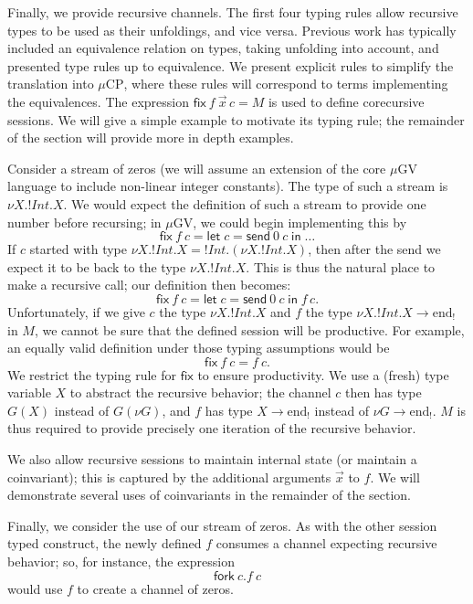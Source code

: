 \documentclass[orivec,envcountsame]{llncs}
\newcommand{\gvout}[2]{{!#1.#2}}
\newcommand{\uto}{\ensuremath{\rightarrow}}
\newcommand{\outterm}{\mathrm{end}_!}
\newcommand{\mkwd}[1]{\mathsf{#1}}
\newcommand{\gvsend}[2]{\mkwd{send}\:#1\:#2}
\newcommand{\gvlet}[3]{\mkwd{let}\;#1 = #2\;\mkwd{in}\;#3}
\newcommand{\gvfork}[2]{\mkwd{fork}\:#1.#2}
\newcommand{\lrkwd}{\mkwd{fix}}
\newcommand{\gvfix}[3]{\lrkwd\:#1\:#2 = #3}
\newcommand{\mucp}{$\mu\mathrm{CP}$\xspace}
\newcommand{\mugv}{$\mu\mathrm{GV}$\xspace}
\begin{document}
Finally, we provide recursive channels. The first four typing rules allow recursive types to be used
as their unfoldings, and vice versa. Previous work has typically included an equivalence relation on
types, taking unfolding into account, and presented type rules up to equivalence. We present
explicit rules to simplify the translation into \mucp, where these rules will correspond to terms
implementing the equivalences. The expression $\gvfix{f}{\vec{x}\,c}{M}$ is used to define
corecursive sessions.  We will give a simple example to motivate its typing rule; the remainder of
the section will provide more in depth examples.

Consider a stream of zeros (we will assume an extension of the core \mugv language to include
non-linear integer constants).  The type of such a stream is $\nu X. !Int.X$.  We would expect the
definition of such a stream to provide one number before recursing; in \mugv, we could begin
implementing this by
\[
  \lrkwd \: f\:c = \gvlet{c}{\gvsend{0}{c}}{\dots}
\]
If $c$ started with type $\nu X.\gvout{Int}{X} = \gvout{Int}{(\nu X.\gvout{Int}{X})}$, then after
the send we expect it to be back to the type $\nu X.\gvout{Int}{X}$.  This is thus the natural place
to make a recursive call; our definition then becomes:
\[ \lrkwd \: f\:c = \gvlet{c}{\gvsend{0}{c}}{f\,c}.\]
Unfortunately, if we give $c$ the type $\nu X.\gvout{Int}{X}$ and $f$ the type $\nu X.\gvout{Int}{X}
\uto \outterm$ in $M$, we cannot be sure that the defined session will be productive.  For example,
an equally valid definition under those typing assumptions would be
\[ \lrkwd \: f\:c = f\:c.\]
We restrict the typing rule for $\lrkwd$ to ensure productivity.  We use a (fresh) type variable $X$
to abstract the recursive behavior; the channel $c$ then has type $G(X)$ instead of $G(\nu G)$, and
$f$ has type $X \uto \outterm$ instead of $\nu G \uto \outterm$.  $M$ is thus required to provide
precisely one iteration of the recursive behavior.

We also allow recursive sessions to maintain internal state (or maintain a coinvariant); this is
captured by the additional arguments $\vec{x}$ to $f$.  We will demonstrate several uses of
coinvariants in the remainder of the section.

Finally, we consider the use of our stream of zeros.  As with the other session typed construct, the
newly defined $f$ consumes a channel expecting recursive behavior; so, for instance, the expression
\[
  \gvfork{c}{f\:c}
\]
would use $f$ to create a channel of zeros.
\end{document}
